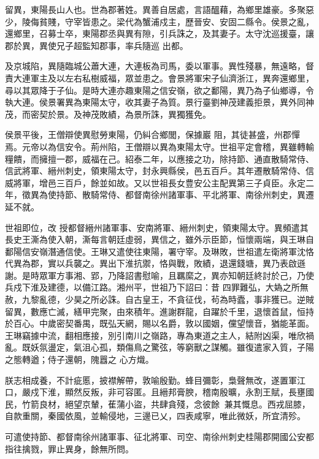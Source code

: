 \begin{pinyinscope}
 留異，東陽長山人也。世為郡著姓。異善自居處，言語醞藉，為鄉里雄豪。多聚惡少，陵侮貧賤，守宰皆患之。梁代為蟹浦戍主，歷晉安、安固二縣令。侯景之亂，還鄉里，召募士卒，東陽郡丞與異有隙，引兵誅之，及其妻子。太守沈巡援臺，讓郡於異，異使兄子超監知郡事，率兵隨巡
 出都。



 及京城陷，異隨臨城公蕭大連，大連板為司馬，委以軍事。異性殘暴，無遠略，督責大連軍主及以左右私樹威福，眾並患之。會景將軍宋子仙濟浙江，異奔還鄉里，尋以其眾降于子仙。是時大連亦趣東陽之信安嶺，欲之鄱陽，異乃為子仙鄉導，令執大連。侯景署異為東陽太守，收其妻子為質。景行臺劉神茂建義拒景，異外同神茂，而密契於景。及神茂敗績，為景所誅，異獨獲免。



 侯景平後，王僧辯使異慰勞東陽，仍糾合鄉閭，保據巖
 阻，其徒甚盛，州郡憚焉。元帝以為信安令。荊州陷，王僧辯以異為東陽太守。世祖平定會稽，異雖轉輸糧饋，而擁擅一郡，威福在己。紹泰二年，以應接之功，除持節、通直散騎常侍、信武將軍、縉州刺史，領東陽太守，封永興縣侯，邑五百戶。其年遷散騎常侍、信威將軍，增邑三百戶，餘並如故。又以世祖長女豊安公主配異第三子貞臣。永定二年，徵異為使持節、散騎常侍、都督南徐州諸軍事、平北將軍、南徐州刺史，異遷延不就。



 世祖即位，改
 授都督縉州諸軍事、安南將軍、縉州刺史，領東陽太守。異頻遣其長史王澌為使入朝，澌每言朝廷虛弱，異信之，雖外示臣節，恒懷兩端，與王琳自鄱陽信安嶺潛通信使。王琳又遣使往東陽，署守宰。及琳敗，世祖遣左衛將軍沈恪代異為郡，實以兵襲之。異出下淮抗禦，恪與戰，敗績，退還錢塘，異乃表啟遜謝。是時眾軍方事湘、郢，乃降詔書慰喻，且羈縻之，異亦知朝廷終討於己，乃使兵戍下淮及建德，以備江路。湘州平，世祖乃下詔曰：昔
 四罪難弘，大媯之所無赦，九黎亂德，少昊之所必誅。自古皇王，不貪征伐，茍為時蠹，事非獲已。逆賊留異，數應亡滅，繕甲完聚，由來積年。進謝群龍，自躍於千里，退懷首鼠，恒持於百心。中歲密契番禺，既弘天網，賜以名爵，敦以國姻，儻望懷音，猶能革面。王琳竊據中流，翻相應接，別引南川之嶺路，專為東道之主人，結附凶渠，唯欣禍亂。既妖氛盪定，氣沮心孤，類傷鳥之驚弦，等窮獸之謀觸。雖復遣家入質，子陽之態轉遒；侍子還朝，隗囂之
 心方熾。



 朕志相成養，不計疵慝，披襟解帶，敦喻殷勤。蜂目彌彰，梟聲無改，遂置軍江口，嚴戍下淮，顯然反叛，非可容匿。且縉邦膏腴，稽南殷曠，永割王賦，長壅國民，竹箭良材，絕望京輦，萑蒲小盜，共肆貪殘，念彼餘，兼其慨息。西戎屈膝，自款重關，秦國依風，並輸侵地，三邊已乂，四表咸寧，唯此微妖，所宜清殄。



 可遣使持節、都督南徐州諸軍事、征北將軍、司空、南徐州刺史桂陽郡開國公安都指往擒戮，罪止異身，餘無所問。




\end{pinyinscope}
